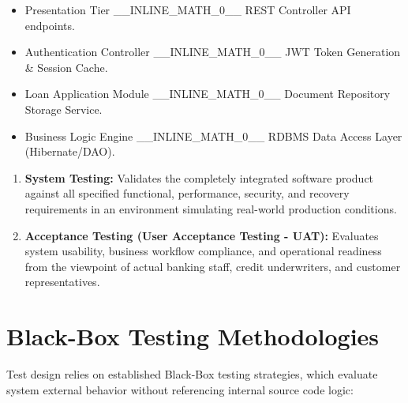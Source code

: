 \begin{itemize}
  \item Presentation Tier \_\_INLINE\_MATH\_0\_\_ REST Controller API endpoints.
  \item Authentication Controller \_\_INLINE\_MATH\_0\_\_ JWT Token Generation \& Session Cache.
  \item Loan Application Module \_\_INLINE\_MATH\_0\_\_ Document Repository Storage Service.
  \item Business Logic Engine \_\_INLINE\_MATH\_0\_\_ RDBMS Data Access Layer (Hibernate/DAO).
\end{itemize}

\begin{enumerate}
  \item \textbf{System Testing:} Validates the completely integrated software product against all specified functional, performance, security, and recovery requirements in an environment simulating real-world production conditions.
  \item \textbf{Acceptance Testing (User Acceptance Testing - UAT):} Evaluates system usability, business workflow compliance, and operational readiness from the viewpoint of actual banking staff, credit underwriters, and customer representatives.
\end{enumerate}

\section{Black-Box Testing Methodologies}

Test design relies on established Black-Box testing strategies, which evaluate system external behavior without referencing internal source code logic:

